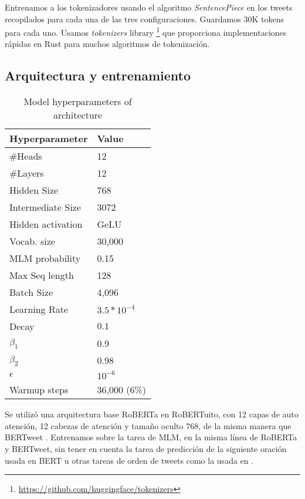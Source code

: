 Entrenamos a los tokenizadores usando el algoritmo \emph{SentencePiece} en los tweets recopilados para cada una de las tres configuraciones. Guardamos 30K tokens para cada uno. Usamos \emph{tokenizers} library \footnote{\url{https://github.com/huggingface/tokenizers}} que proporciona implementaciones rápidas en Rust para muchos algoritmos de tokenización.

\subsection{Arquitectura y entrenamiento}

\begin{table}[t]
    \centering
    \begin{tabular}{l|l}
        \hline
        Hyperparameter  & Value \\
        \hline
        \#Heads           & 12             \\
        \#Layers          & 12             \\
        Hidden Size       & 768            \\
        Intermediate Size & 3072           \\
        Hidden activation & GeLU           \\
        Vocab. size       & 30,000         \\
        \hline
        MLM probability   & 0.15           \\
        Max Seq length    & 128            \\
        Batch Size        & 4,096          \\
        Learning Rate     & $3.5 * 10^{-4}$\\
        Decay             & $0.1$          \\
        $\beta_1$         & 0.9            \\
        $\beta_2$         & 0.98           \\
        $\epsilon$        & $10^{-6}$      \\
        Warmup steps      & 36,000 (6\%)   \\
        \hline
    \end{tabular}
    \caption{Model hyperparameters of \robertuito{} architecture}
    \label{tab:robertuito_architecture}
\end{table}

Se utilizó una arquitectura base RoBERTa en RoBERTuito, con 12 capas de auto atención, 12 cabezas de atención y tamaño oculto 768, de la misma manera que BERTweet \cite{bertweet}. Entrenamos sobre la tarea de MLM, en la misma línea de RoBERTa y BERTweet, sin tener en cuenta la tarea de predicción de la siguiente oración usada en BERT u otras tareas de orden de tweets como la usada en \citet{gonzalez2021twilbert}.

